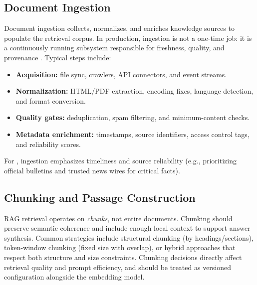 \subsection{Document Ingestion}
Document ingestion collects, normalizes, and enriches knowledge sources to populate the retrieval corpus. In production, ingestion is not a one-time job: it is a continuously running subsystem responsible for freshness, quality, and provenance \cite{Pryon2023}. Typical steps include:
\begin{itemize}
    \item \textbf{Acquisition:} file sync, crawlers, API connectors, and event streams.
    \item \textbf{Normalization:} HTML/PDF extraction, encoding fixes, language detection, and format conversion.
    \item \textbf{Quality gates:} deduplication, spam filtering, and minimum-content checks.
    \item \textbf{Metadata enrichment:} timestamps, source identifiers, access control tags, and reliability scores.
\end{itemize}
For \ishtar{}, ingestion emphasizes timeliness and source reliability (e.g., prioritizing official bulletins and trusted news wires for critical facts).

\subsection{Chunking and Passage Construction}
RAG retrieval operates on \emph{chunks}, not entire documents. Chunking should preserve semantic coherence and include enough local context to support answer synthesis. Common strategies include structural chunking (by headings/sections), token-window chunking (fixed size with overlap), or hybrid approaches that respect both structure and size constraints. Chunking decisions directly affect retrieval quality and prompt efficiency, and should be treated as versioned configuration alongside the embedding model.

